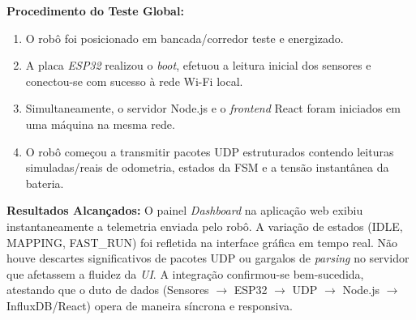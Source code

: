 \textbf{Procedimento do Teste Global:}
\begin{enumerate}
    \item O robô foi posicionado em bancada/corredor teste e energizado.
    \item A placa \textit{ESP32} realizou o \textit{boot}, efetuou a leitura inicial dos sensores e conectou-se com sucesso à rede Wi-Fi local.
    \item Simultaneamente, o servidor Node.js e o \textit{frontend} React foram iniciados em uma máquina na mesma rede.
    \item O robô começou a transmitir pacotes UDP estruturados contendo leituras simuladas/reais de odometria, estados da FSM e a tensão instantânea da bateria.
\end{enumerate}

\textbf{Resultados Alcançados:}
O painel \textit{Dashboard} na aplicação web exibiu instantaneamente a telemetria enviada pelo robô. A variação de estados (IDLE, MAPPING, FAST\_RUN) foi refletida na interface gráfica em tempo real. Não houve descartes significativos de pacotes UDP ou gargalos de \textit{parsing} no servidor que afetassem a fluidez da \textit{UI}. A integração confirmou-se bem-sucedida, atestando que o duto de dados (Sensores $\rightarrow$ ESP32 $\rightarrow$ UDP $\rightarrow$ Node.js $\rightarrow$ InfluxDB/React) opera de maneira síncrona e responsiva.
